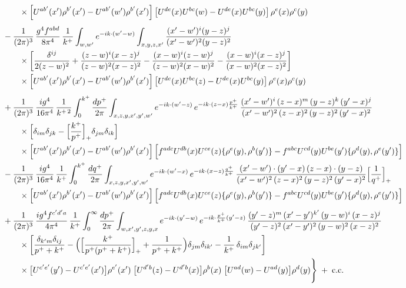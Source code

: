 \documentclass[9pt]{article}
\numberwithin{equation}{section}
\begin{document}
\begin{align}
&\qquad\times\left[U^{ab'}(x')\rho^{b'}(x')-U^{ab'}(w')\rho^{b'}(x')\right]\left[U^{de}(x)U^{bc}(w)-U^{de}(x)U^{bc}(y)\right]\rho^{e}(x)\rho^{c}(y)\notag\\[4pt]
&-\frac{1}{(2\pi)^{3}}\,\frac{g^{4}f^{abd}}{8\pi^{4}}\,\frac{1}{k^{+}}\int_{w,w'}e^{-ik\cdot(w'-w)}\int_{x,y,z,x'}\frac{(x'-w')^{i}(y-z)^{j}}{(x'-w')^{2}(y-z)^{2}}\notag\\&\qquad\times\bigg[\frac{\delta^{ij}}{2(z-w)^{2}}+\frac{(z-w)^{i}(x-z)^{j}}{(z-w)^{2}(x-z)^{2}}-\frac{(x-w)^{i}(z-w)^{j}}{(z-w)^{2}(x-w)^{2}}-\frac{(x-w)^{i}(x-z)^{j}}{(x-w)^{2}(x-z)^{2}}\bigg]\notag\\
&\qquad\times\left[U^{ab'}(x')\rho^{b'}(x')-U^{ab'}(w')\rho^{b'}(x')\right]\left[U^{de}(x)U^{bc}(z)-U^{de}(x)U^{bc}(y)\right]\rho^{e}(x)\rho^{c}(y)\notag\\[4pt]
&+\frac{1}{(2\pi)^{3}}\, \frac{ig^{4}}{16\pi^{4}}\, \frac{1}{k^{+\,2}}\int_{0}^{k^{+}} \frac{dp^{+}}{2\pi}\int_{x,z,y,x',y',w'}e^{-ik\cdot (w'-z)}\,e^{-ik\cdot (z-x)\frac{p^{+}}{k^{+}}}\,\frac{(x'-w')^{i}\,(z-x)^{m}\,(y-z)^{k}\,(y'-x)^{j}}{(x'-w')^{2}\,(z-x)^{2}\,(y-z)^{2}\,(y'-x)^{2}}\notag\\&\qquad\times\Big[\delta_{im}\delta_{jk}-\Big[\frac{k^{+}}{p^{+}}\Big]_{+}\delta_{jm}\delta_{ik}\Big]\notag\\
&\qquad\times\left[U^{ab'}(x')\rho^{b'}(x')-U^{ab'}(w')\rho^{b'}(x')\right]\Big[f^{adc}U^{db}(x)U^{ce}(z)\{\rho^{e}(y),\rho^{b}(y')\}-f^{abc}U^{cd}(y)U^{be}(y')\{\rho^{d}(y),\rho^{e}(y')\}\Big]\notag\\
&-\frac{1}{(2\pi)^{3}}\, \frac{ig^{4}}{16\pi^{4}}\, \frac{1}{k^{+}}\int_{0}^{k^{+}}\frac{dq^{+}}{2\pi}\int_{x,z,y,x',y',w'}e^{-ik\cdot (w'-x)}\,e^{-ik\cdot (x-z)\frac{q^{+}}{k^{+}}}\,\frac{(x'-w')\cdot (y'-x)\,(z-x)\cdot (y-z)}{(x'-w')^{2}\,(z-x)^{2}\,(y-z)^{2}\,(y'-x)^{2}}\Big[\frac{1}{q^{+}}\Big]_{+}\notag\\
&\qquad\times\left[U^{ab'}(x')\rho^{b'}(x')-U^{ab'}(w')\rho^{b'}(x')\right]\Big[f^{adc}U^{db}(x)U^{ce}(z)\{\rho^{e}(y),\rho^{b}(y')\}-f^{abc}U^{cd}(y)U^{be}(y')\{\rho^{d}(y),\rho^{e}(y')\}\Big]\notag\\[4pt]
&+\frac{1}{(2\pi)^{3}}\,\frac{ig^{4}f^{c'd'a}}{4\pi^{4}}\,\frac{1}{k^{+}}\int_{0}^{\infty}\frac{dp^{+}}{2\pi}\int_{w,x',y',z,y,x}e^{-ik\cdot(y'-w)}\,e^{-ik\cdot\frac{p^{+}}{k^{+}}(y'-z)}\,\frac{(y'-z)^{m}\,(x'-y')^{k'}\,(y-w)^{i}\,(x-z)^{j}}{(y'-z)^{2}\,(x'-y')^{2}\,(y-w)^{2}\,(x-z)^{2}}\notag\\
&\qquad\times\bigg[\frac{\delta_{k'm}\delta_{ij}}{p^{+}+k^{+}}-\Big(\Big[\frac{k^{+}}{p^{+}(p^{+}+k^{+})}\Big]_{+}+\frac{1}{p^{+}+k^{+}}\Big)\delta_{jm}\delta_{ik'}-\frac{1}{k^{+}}\,\delta_{im}\delta_{jk'}\bigg]\notag\\
&\qquad\times\big[U^{c'e'}(y')-U^{c'e'}(x')\big]\rho^{e'}(x')\;\big[U^{d'b}(z)-U^{d'b}(x)\big]\rho^{b}(x)\;\big[U^{ad}(w)-U^{ad}(y)\big]\rho^{d}(y)\Bigg\}\;+\;{\rm c.c.}
\end{align}
\end{document}
